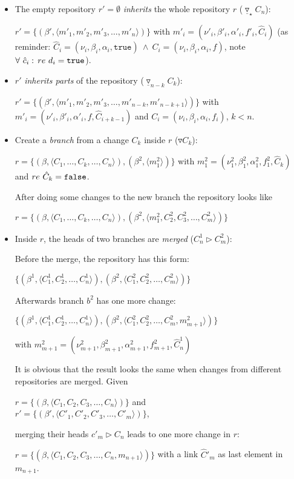 \documentclass[fleqn, 10pt, a4paper]{report} \usepackage{amssymb}
\begin{document}
\begin{itemize}
\item The empty repository $r'=\emptyset$ \emph{inherits} the whole
  repository $r$ ($\underline\triangledown_\star C_n$):

  $r' = \{(\beta', \langle m'_1, m'_2, m'_3, \ldots, m'_n\rangle)\}$
  with $m'_i = (\nu'_i, \beta'_i, \alpha'_i, f'_i, \hat C_i)$ (as
  reminder: $\hat C_i = (\nu_i, \beta_i, \alpha_i, \mathtt{true})\
  \wedge\ C_i=(\nu_i, \beta_i, \alpha_i, f)$, note $\forall\ \hat
  c_i:\, \mathnormal{re}\ d_i=\mathtt{true}$).

\item $r'$ \emph{inherits parts} of the repository
  ($\underline\triangledown_ {n-k}C_k$):

  $r'=\{(\beta', \langle m'_1, m'_2, m'_3, \ldots, m'_{n-k},
  m'_{n-k+1}\rangle)\}$ with $m'_i=(\nu'_i, \beta'_i, \alpha'_i, f,
  \hat C_{i+k-1})$ and $C_{i}=(\nu_i, \beta_i, \alpha_i, f_i)$, $k<n$.

\item Create a \emph{branch} from a change $C_k$ inside $r$
  ($\triangledown C_k$):

  $r = \{(\beta, \langle C_1, \ldots, C_k, \ldots, C_n\rangle),
  (\beta^2, \langle m_1^2 \rangle)\}$ with $m_1^2=(\nu_1^2, \beta_1^2,
  \alpha_1^2, f_1^2, \hat C_k)$ and $\mathnormal{re}\ \hat
  C_k=\mathtt{false}$.

  After doing some changes to the new branch the repository looks like

  $r = \{(\beta, \langle C_1, \ldots, C_k, \ldots, C_n\rangle),
  (\beta^2, \langle m_1^2, C_2^2, C_3^2, \ldots, C_m^2\rangle )\}$

\item Inside $r$, the heads of two branches are \emph{merged} ($C_n^1
  \rhd C_m^2$):

  Before the merge, the repository has this form:

  $\{(\beta^1, \langle C_1^1, C_2^1, \ldots, C_n^1\rangle), (\beta^2,
  \langle C_1^2, C_2^2, \ldots, C_m^2\rangle)\}$

  Afterwards branch $b^2$ has one more change:

  $\{(\beta^1, \langle C_1^1, C_2^1, \ldots, C_n^1\rangle), (\beta^2,
  \langle C_1^2, C_2^2, \ldots, C_m^2, m_{m+1}^2\rangle)\}$

  with $m_{m+1}^2=(\nu_{m+1}^2, \beta_{m+1}^2, \alpha_{m+1}^2,
  f_{m+1}^2, \hat C_n^1)$

  It is obvious that the result looks the same when changes from
  different repositories are merged. Given

  $r = \{(\beta, \langle C_1, C_2, C_3, \ldots, C_n\rangle)\}$ and \\
  $r' = \{(\beta', \langle C'_1, C'_2, C'_3, \ldots, C'_m\rangle)\}$,

  merging their heads $c'_m \rhd C_n$ leads to one more change in $r$:

  $r = \{(\beta, \langle C_1, C_2, C_3, \ldots, C_n,
  m_{n+1}\rangle)\}$ with a link $\hat C'_m$ as last element in
  $m_{n+1}$.
\end{itemize}
\end{document}
